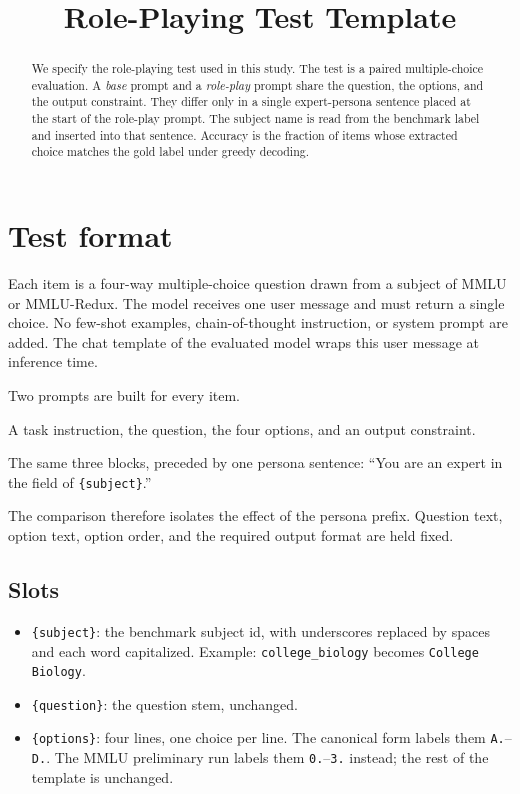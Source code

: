 \documentclass[11pt]{article}
\title{Role-Playing Test Template}
\author{}
\date{}
\newcommand{\slot}[1]{\texttt{\{#1\}}}
\begin{document}
\maketitle

\begin{abstract}
We specify the role-playing test used in this study.
The test is a paired multiple-choice evaluation.
A \emph{base} prompt and a \emph{role-play} prompt share the question, the options, and the output constraint.
They differ only in a single expert-persona sentence placed at the start of the role-play prompt.
The subject name is read from the benchmark label and inserted into that sentence.
Accuracy is the fraction of items whose extracted choice matches the gold label under greedy decoding.
\end{abstract}

\section{Test format}
Each item is a four-way multiple-choice question drawn from a subject of MMLU or MMLU-Redux.
The model receives one user message and must return a single choice.
No few-shot examples, chain-of-thought instruction, or system prompt are added.
The chat template of the evaluated model wraps this user message at inference time.

Two prompts are built for every item.
\begin{description}[leftmargin=1.6em,style=nextline]
  \item[Base.] A task instruction, the question, the four options, and an output constraint.
  \item[Role-play.] The same three blocks, preceded by one persona sentence:
  ``You are an expert in the field of \slot{subject}.''
\end{description}
The comparison therefore isolates the effect of the persona prefix.
Question text, option text, option order, and the required output format are held fixed.

\subsection{Slots}
\begin{itemize}[leftmargin=1.4em]
  \item \slot{subject}: the benchmark subject id, with underscores replaced by spaces and each word capitalized.
  Example: \texttt{college\_biology} becomes \texttt{College Biology}.
  \item \slot{question}: the question stem, unchanged.
  \item \slot{options}: four lines, one choice per line.
  The canonical form labels them \texttt{A.}--\texttt{D.}.
  The MMLU preliminary run labels them \texttt{0.}--\texttt{3.} instead; the rest of the template is unchanged.
\end{itemize}
\end{document}
